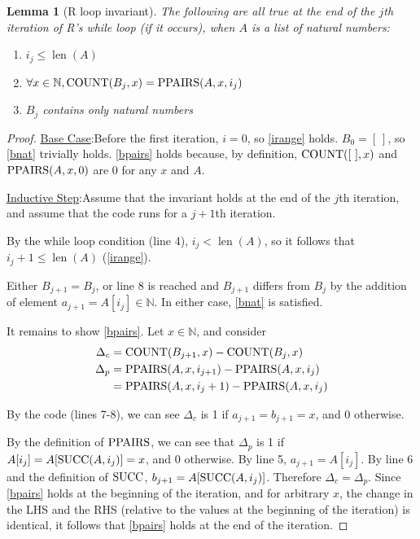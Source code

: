 \documentclass[boldsans]{article}
\newtheorem{lemma}[theorem]{Lemma}
\newcommand{\N}{\mathbb{N}}
\newcommand{\proofheader}[1]{\noindent \underline{#1}}
\newcommand{\base}{\proofheader{Base Case}:}
\newcommand{\istep}{\proofheader{Inductive Step}:}
\DeclareMathOperator{\len}{len}
\newcommand{\emptylist}{[~]}
\begin{document}
\begin{lemma}[R loop invariant]
\label{rinv}
The following are all true at the end of the $j$th iteration of R's while loop (if it occurs), when $A$ is a list of natural numbers:

\begin{enumerate}[ref=(\alph*),label=(\alph*)]
    \item $i_j \leq \len(A)$ \label{irange}
    \item $\forall x \in \N, \COUNT(B_j, x) = \ppairs(A, x, i_j)$ \label{bpairs}
    \item $B_j$ contains only natural numbers \label{bnat}
\end{enumerate}
\end{lemma}
\begin{proof}
\base Before the first iteration, $i=0$, so \ref{irange} holds. $B_0 = \emptylist$, so \ref{bnat} trivially holds. \ref{bpairs} holds because, by definition, $\COUNT(\emptylist, x)$ and $\operatorname{PPAIRS}(A, x, 0)$ are 0 for any $x$ and $A$.

\istep Assume that the invariant holds at the end of the $j$th iteration, and assume that the code runs for a $j+1$th iteration.

By the while loop condition (line 4), $i_j < \len(A)$, so it follows that $i_j + 1 \leq \len(A)$ (\ref{irange}).

Either $B_{j+1} = B_j$, or line 8 is reached and $B_{j+1}$ differs from $B_j$ by the addition of element $a_{j+1} = A[i_j] \in \N$. In either case, \ref{bnat} is satisfied.


It remains to show \ref{bpairs}. Let $x \in \N$, and consider
\begin{align*}
\Delta_c &= \operatorname{COUNT}(B_{j+1}, x) - \operatorname{COUNT}(B_{j}, x) \\
\Delta_p &= \operatorname{PPAIRS}(A, x, i_{j+1}) - \operatorname{PPAIRS}(A, x, i_j) \\
&= \operatorname{PPAIRS}(A, x, i_j +1) - \operatorname{PPAIRS}(A, x, i_j)
\end{align*}

By the code (lines 7-8), we can see $\Delta_c$ is 1 if $a_{j+1} = b_{j+1} = x$, and 0 otherwise.

By the definition of $\operatorname{PPAIRS}$, we can see that $\Delta_p$ is 1 if $A[i_j] = A[\operatorname{SUCC}(A, i_j)] = x$, and 0 otherwise. By line 5, $a_{j+1} = A[i_j]$. By line 6 and the definition of $\operatorname{SUCC}$, $b_{j+1} = A[\operatorname{SUCC}(A, i_j)]$. Therefore $\Delta_c = \Delta_p$. Since \ref{bpairs} holds at the beginning of the iteration, and for arbitrary $x$, the change in the LHS and the RHS (relative to the values at the beginning of the iteration) is identical, it follows that \ref{bpairs} holds at the end of the iteration.
\end{proof}
\end{document}
